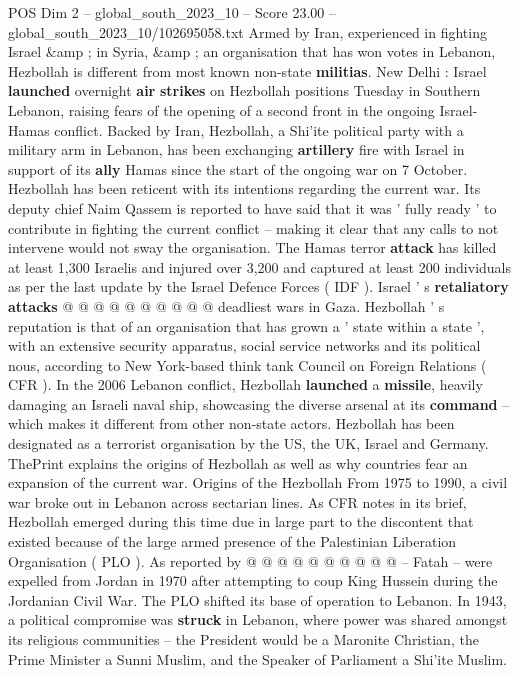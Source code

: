 \begin{textsample}{POS Dim 2 – global\_south\_2023\_10 – Score 23.00 – global\_south\_2023\_10/102695058.txt}  \label{ex:f2_pos_054}
Armed by Iran, experienced in fighting Israel \&amp ; in Syria, \&amp ; an organisation that has won votes in Lebanon, Hezbollah is different from most known non-state \textbf{militias}.
New Delhi : Israel \textbf{launched} overnight \textbf{air} \textbf{strikes} on Hezbollah positions Tuesday in Southern Lebanon, raising fears of the opening of a second front in the ongoing Israel- Hamas conflict.
Backed by Iran, Hezbollah, a Shi'ite political party with a military arm in Lebanon, has been exchanging \textbf{artillery} fire with Israel in support of its \textbf{ally} Hamas since the start of the ongoing war on 7 October.
Hezbollah has been reticent with its intentions regarding the current war.
Its deputy chief Naim Qassem is reported to have said that it was ' fully ready ' to contribute in fighting the current conflict -- making it clear that any calls to not intervene would not sway the organisation.
The Hamas terror \textbf{attack} has killed at least 1,300 Israelis and injured over 3,200 and captured at least 200 individuals as per the last update by the Israel Defence Forces ( IDF ).
Israel ' s \textbf{retaliatory} \textbf{attacks} @ @ @ @ @ @ @ @ @ @ deadliest wars in Gaza.
Hezbollah ' s reputation is that of an organisation that has grown a ' state within a state ', with an extensive security apparatus, social service networks and its political nous, according to New York-based think tank Council on Foreign Relations ( CFR ).
In the 2006 Lebanon conflict, Hezbollah \textbf{launched} a \textbf{missile}, heavily damaging an Israeli naval ship, showcasing the diverse arsenal at its \textbf{command} -- which makes it different from other non-state actors.
Hezbollah has been designated as a terrorist organisation by the US, the UK, Israel and Germany.
ThePrint explains the origins of Hezbollah as well as why countries fear an expansion of the current war.
Origins of the Hezbollah From 1975 to 1990, a civil war broke out in Lebanon across sectarian lines.
As CFR notes in its brief, Hezbollah emerged during this time due in large part to the discontent that existed because of the large armed presence of the Palestinian Liberation Organisation ( PLO ).
As reported by @ @ @ @ @ @ @ @ @ @ -- Fatah -- were expelled from Jordan in 1970 after attempting to coup King Hussein during the Jordanian Civil War.
The PLO shifted its base of operation to Lebanon.
In 1943, a political compromise was \textbf{struck} in Lebanon, where power was shared amongst its religious communities -- the President would be a Maronite Christian, the Prime Minister a Sunni Muslim, and the Speaker of Parliament a Shi'ite Muslim.

\end{textsample}
